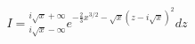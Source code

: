 \documentclass[preview]{standalone}
\begin{document}
\begin{align*}
I=\displaystyle _{i\sqrt{x}-\infty}^{i\sqrt{x}+\infty}e^{-\frac{2}{3}x^{3/2}-\sqrt{x}(z-i\sqrt{x})^2}dz
\end{align*}
\end{document}
